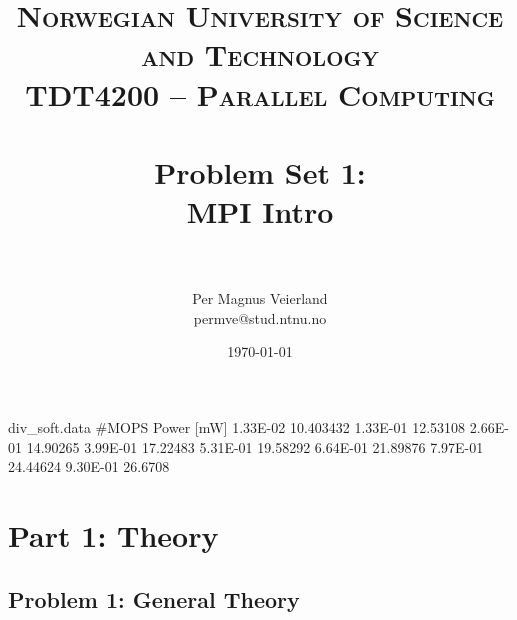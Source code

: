 

\title{	
\normalfont \normalsize 
\textsc{Norwegian University of Science and Technology\\TDT4200 -- Parallel Computing} \\ [25pt]
\horrule{0.5pt} \\[0.4cm]
\huge Problem Set 1:\\ MPI Intro\\
\horrule{2pt} \\[0.5cm]
}

\author{Per Magnus Veierland\\permve@stud.ntnu.no}


\date{\normalsize\today}

\begin{filecontents}{div_soft.data}
#MOPS   Power [mW]
1.33E-02    10.403432
1.33E-01    12.53108
2.66E-01    14.90265
3.99E-01    17.22483
5.31E-01    19.58292
6.64E-01    21.89876
7.97E-01    24.44624
9.30E-01    26.6708
\end{filecontents}


\maketitle

\section*{Part 1: Theory}

\subsection*{Problem 1: General Theory}

